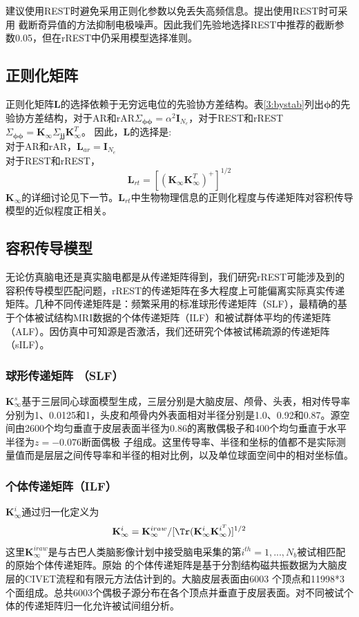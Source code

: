 \cite{yao_method_2001}建议使用REST时避免采用正则化参数以免丢失高频信息。\cite{zhai_y_and_yao_d_study_2004}提出使用REST时可采用
截断奇异值的方法抑制电极噪声。因此我们先验地选择REST中推荐的截断参数0.05，但在rREST中仍采用模型选择准则。
\subsection{正则化矩阵}
正则化矩阵$\mathbf{L}$的选择依赖于无穷远电位的先验协方差结构。表\ref{3:bystab}列出$\mathbf{\phi}$的先验协方差结构，对于AR和rAR$\Sigma_{\mathbf{\phi\phi}}=\alpha^{2}\mathbf{I}_{N_e}$，对于REST和rREST$\Sigma_{\mathbf{\phi\phi}}=\mathbf{K}_{\infty}\Sigma_{\mathbf{jj}}\mathbf{K}_{\infty}^T$。 因此，$\mathbf{L}$的选择是:\\
对于AR和rAR，$\mathbf{L}_{ar} =\mathbf{I}_{N_e}$\\
对于REST和rREST，
\begin{equation}\label{eq3.17}
\mathbf{L}_{rt} =[(\mathbf{K}_\infty\mathbf{K}_\infty^T)^+]^{1/2}
\end{equation}
$\mathbf{K}_\infty$的详细讨论见下一节。$\mathbf{L}_{rt}$中生物物理信息的正则化程度与传递矩阵对容积传导模型的近似程度正相关。
\subsection{容积传导模型}
无论仿真脑电还是真实脑电都是从传递矩阵得到，我们研究rREST可能涉及到的容积传导模型匹配问题，rREST的传递矩阵在多大程度上可能偏离实际真实传递矩阵。几种不同传递矩阵是：频繁采用的标准球形传递矩阵（SLF），最精确的基于个体被试结构MRI数据的个体传递矩阵（ILF）和被试群体平均的传递矩阵（ALF）。因仿真中可知源是否激活，我们还研究个体被试稀疏源的传递矩阵（sILF）。
\subsubsection{球形传递矩阵 （SLF）}
$\mathbf{K}_{\infty}^{s}$基于三层同心球面模型生成，三层分别是大脑皮层、颅骨、头表，相对传导率分别为1、0.0125和1，头皮和颅骨内外表面相对半径分别是1.0、0.92和0.87。源空间由2600个均匀垂直于皮层表面半径为0.86的离散偶极子和400个均匀垂直于水平半径为$z=-0.076$断面偶极
子组成。这里传导率、半径和坐标的值都不是实际测量值而是层层之间传导率和半径的相对比例，以及单位球面空间中的相对坐标值。
\subsubsection{个体传递矩阵（ILF）}
$\mathbf{K}_{\infty}^i$通过归一化定义为
\begin{equation*}
\mathbf{K}_\infty^i=\mathbf{K}_\infty^{iraw}/{[\Tr(\mathbf{K}_\infty^i\mathbf{K}_\infty^{i^T})]^{1/2}}
\end{equation*}
这里$\mathbf{K}_{\infty}^{iraw}$是与古巴人类脑影像计划中接受脑电采集的第$i^{th}=1,...,N_b$被试相匹配的原始个体传递矩阵。原始
的个体传递矩阵是基于分割结构磁共振数据为大脑皮层的CIVET流程和有限元方法估计到的。大脑皮层表面由6003
个顶点和11998*3个面组成。总共6003个偶极子源分布在各个顶点并垂直于皮层表面。对不同被试个体的传递矩阵归一化允许被试间组分析。

